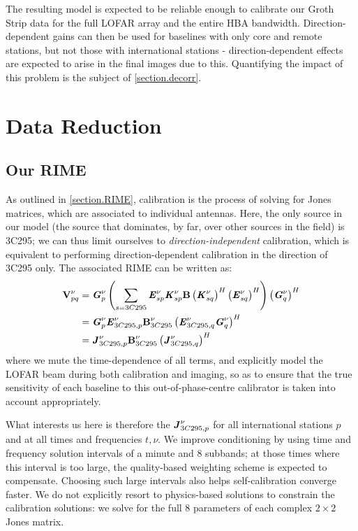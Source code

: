 \pg
The resulting model is expected to be reliable enough to calibrate our Groth Strip data for the full LOFAR array and the entire HBA bandwidth. Direction-dependent gains can then be used for baselines with only core and remote stations, but not those with international stations - direction-dependent effects are expected to arise in the final images due to this. Quantifying the impact of this problem is the subject of \cref{section.decorr}.

\section{Data Reduction}

\subsection{Our RIME}

\pg
As outlined in \cref{section.RIME}, calibration is the process of solving for Jones matrices, which are associated to individual antennas. Here, the only source in our model (the source that dominates, by far, over other sources in the field) is 3C295; we can thus limit ourselves to \textit{direction-independent} calibration, which is equivalent to performing direction-dependent calibration in the direction of 3C295 only. The associated RIME can be written as:
\begin{align}
\textbf{V}_{pq}^{\nu} &= \textbf{\emph{G}}_p^{\nu} \left( \sum_{s=3C295} \textbf{\emph{E}}_{sp}^{\nu} \textbf{\emph{K}}_{sp}^{\nu} \textbf{B} \left(\textbf{\emph{K}}_{sq}^{\nu}\right)^H \left(\textbf{\emph{E}}_{sq}^{\nu}\right)^H \right) \left(\textbf{\emph{G}}_q^{\nu}\right)^H\\
		  &= \textbf{\emph{G}}_p^{\nu} \textbf{\emph{E}}_{3C295,p}^{\nu} \textbf{B}_{3C295}^{\nu} \left(\textbf{\emph{E}}_{3C295,q}^{\nu} \textbf{\emph{G}}_q^{\nu}\right)^H\\
		  &= \textbf{\emph{J}}_{3C295,p}^{\nu} \textbf{B}_{3C295}^{\nu} \left(\textbf{\emph{J}}_{3C295,q}^{\nu}\right)^H\label{3c295.dirin.cal}
\end{align}
where we mute the time-dependence of all terms, and explicitly model the LOFAR beam during both calibration and imaging, so as to ensure that the true sensitivity of each baseline to this out-of-phase-centre calibrator is taken into account appropriately.

\pg
What interests us here is therefore the $\textbf{\emph{J}}_{3C295,p}^{\nu}$ for all international stations $p$ and at all times and frequencies $t,\nu$. We improve conditioning by using time and frequency solution intervals of a minute and 8 subbands; at those times where this interval is too large, the quality-based weighting scheme is expected to compensate. Choosing such large intervals also helps self-calibration converge faster. We do not explicitly resort to physics-based solutions to constrain the calibration solutions: we solve for the full 8 parameters of each complex $2\times 2$ Jones matrix.



